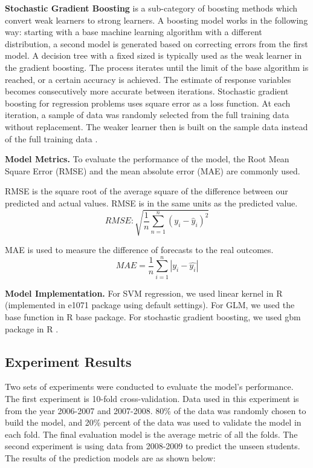 \documentclass[12pt,english]{report}
\begin{document}
\vspace{0.15in}
\noindent \textbf{Stochastic Gradient Boosting} is a sub-category of boosting methods which convert weak learners to strong learners. A boosting model works in the following way: starting with a base machine learning algorithm with a different distribution,  a second model is generated based on correcting errors from the first model. A decision tree with a fixed sized is typically used as the weak learner in the gradient boosting. The process iterates until the limit of the base algorithm is reached, or a certain accuracy is achieved. The estimate of response variables becomes consecutively more accurate between iterations. Stochastic gradient boosting for regression problems uses square error as a loss function. At each iteration, a sample of data was randomly selected from the full training data without replacement. The weaker learner then is built on the sample data instead of the full training data \citep{FRIEDMAN2002367}. 
% 
% 

\vspace{0.15in}
\noindent \textbf{Model Metrics.} To evaluate the performance of the model, the Root Mean Square Error (RMSE)  and the mean absolute error (MAE) are commonly used. 

RMSE is the square root of the average square of the difference between our predicted and actual values. RMSE is in the same units as the predicted value.
\begin{equation}
RMSE:  \sqrt{\frac{1}{n}\sum_{n=1}^n (y_i-\hat{y}_i)^2}
\end{equation}

MAE is used to measure the difference of forecasts to the real outcomes.
\begin{equation}
MAE = \frac{1}{n}\sum_{i=1}^n \left| y_i - \hat{y_i}\right| 
\end{equation}

\vspace{0.15in}
\textbf{Model Implementation.} For SVM regression, we used linear kernel in R (implemented in e1071 package \citep{e1071} using default settings). For GLM, we used the base function in R base package. For stochastic gradient boosting, we used gbm package in R \citep{gbm}.

\subsection{Experiment Results}
Two sets of experiments were conducted to evaluate the model's performance. The 
first experiment is 10-fold cross-validation. Data used in this experiment is from 
the year 2006-2007 and 2007-2008.  80\% of the data was randomly chosen 
to build the model, and 20\% percent of the data was used to validate the model in 
each fold. The final evaluation model is the average metric of all the folds. The 
second experiment is using data from 2008-2009 to predict the unseen students.  The 
results of the prediction models are as shown below:
\end{document}
